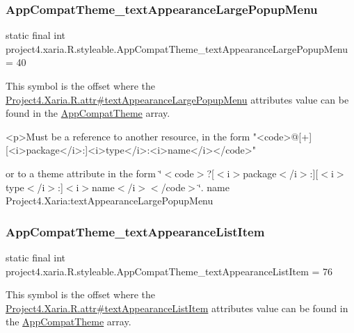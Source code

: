 \subsubsection{\texorpdfstring{App\+Compat\+Theme\+\_\+text\+Appearance\+Large\+Popup\+Menu}{AppCompatTheme\_textAppearanceLargePopupMenu}}
{\footnotesize\ttfamily static final int project4.\+xaria.\+R.\+styleable.\+App\+Compat\+Theme\+\_\+text\+Appearance\+Large\+Popup\+Menu = 40\hspace{0.3cm}{\ttfamily [static]}}

This symbol is the offset where the \hyperlink{}{Project4.\+Xaria.\+R.\+attr\#text\+Appearance\+Large\+Popup\+Menu} attribute\textquotesingle{}s value can be found in the \hyperlink{classproject4_1_1xaria_1_1R_1_1styleable_aad8bec413e2350f9404e6ff0e831a85d}{App\+Compat\+Theme} array.

\begin{DoxyVerb}      <p>Must be a reference to another resource, in the form "<code>@[+][<i>package</i>:]<i>type</i>:<i>name</i></code>"
\end{DoxyVerb}
 or to a theme attribute in the form \char`\"{}$<$code$>$?\mbox{[}$<$i$>$package$<$/i$>$\+:\mbox{]}\mbox{[}$<$i$>$type$<$/i$>$\+:\mbox{]}$<$i$>$name$<$/i$>$$<$/code$>$\char`\"{}.  name Project4.\+Xaria\+:text\+Appearance\+Large\+Popup\+Menu \mbox{\label{classproject4_1_1xaria_1_1R_1_1styleable_aa6c67f0600a5d8caedaf5e80e8a4acb7}} 
\subsubsection{\texorpdfstring{App\+Compat\+Theme\+\_\+text\+Appearance\+List\+Item}{AppCompatTheme\_textAppearanceListItem}}
{\footnotesize\ttfamily static final int project4.\+xaria.\+R.\+styleable.\+App\+Compat\+Theme\+\_\+text\+Appearance\+List\+Item = 76\hspace{0.3cm}{\ttfamily [static]}}

This symbol is the offset where the \hyperlink{}{Project4.\+Xaria.\+R.\+attr\#text\+Appearance\+List\+Item} attribute\textquotesingle{}s value can be found in the \hyperlink{classproject4_1_1xaria_1_1R_1_1styleable_aad8bec413e2350f9404e6ff0e831a85d}{App\+Compat\+Theme} array.

